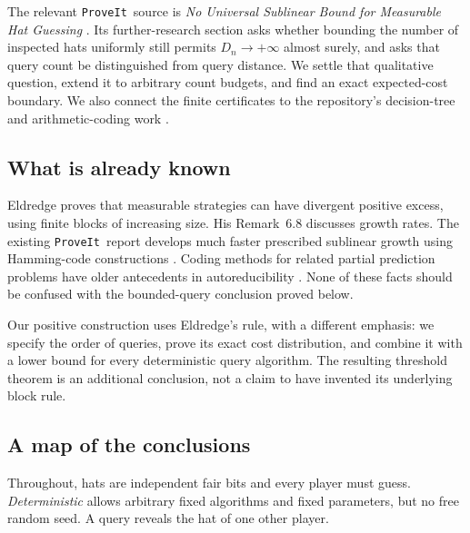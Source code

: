 \documentclass[11pt,letterpaper]{article}
\theoremstyle{definition}
\newcommand{\repo}{\texttt{ProveIt}}
\begin{document}
The relevant \repo\ source is \emph{No Universal Sublinear Bound for
Measurable Hat Guessing} \cite{qry:PriorHat}. Its further-research section
asks whether bounding the number of inspected hats uniformly still
permits \(D_n\to+\infty\) almost surely, and asks that query count be
distinguished from query distance. We settle that qualitative question,
extend it to arbitrary count budgets, and find an exact expected-cost
boundary. We also connect the finite certificates to the repository's
decision-tree and arithmetic-coding work \cite{qry:RepoBoxes,qry:ListCoding}.

\subsection{What is already known}

Eldredge proves that measurable strategies can have divergent positive
excess, using finite blocks of increasing size. His Remark~6.8 discusses
growth rates. The existing \repo\ report develops much faster prescribed
sublinear growth using Hamming-code constructions
\cite{hat:Eldredge,qry:PriorHat}. Coding methods for related partial prediction
problems have older antecedents in autoreducibility
\cite{hat:EMV}. None of these facts should be confused with the
bounded-query conclusion proved below.

Our positive construction uses Eldredge's rule, with a different emphasis:
we specify the order of queries, prove its exact cost distribution,
and combine it with a lower bound for every deterministic query algorithm.
The resulting threshold theorem is an additional conclusion, not a
claim to have invented its underlying block rule.

\subsection{A map of the conclusions}

Throughout, hats are independent fair bits and every player must guess.
\emph{Deterministic} allows arbitrary fixed algorithms and fixed parameters,
but no free random seed. A query reveals the hat of one other player.
\end{document}
